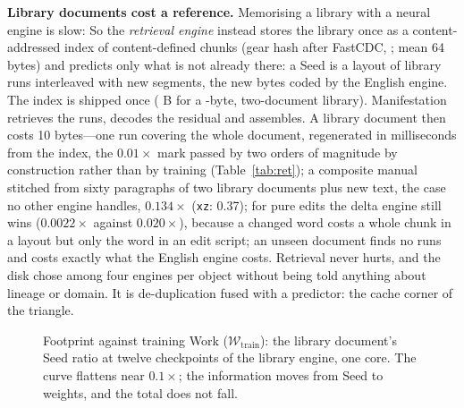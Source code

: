 \documentclass[11pt,a4paper]{article}
\theoremstyle{definition}
\theoremstyle{plain}
\theoremstyle{remark}
\newcommand{\Work}{\mathcal{W}}
\begin{document}
\textbf{Library documents cost a reference.} Memorising a library with a neural engine is slow:
\libworkShort{} So
the \emph{retrieval engine} instead stores the library once as a content-addressed index of
content-defined chunks (gear hash after FastCDC, \citealp{xia2016fastcdc}; mean 64 bytes) and
predicts only what is not already there: a Seed is a layout of library runs interleaved with new
segments, the new bytes coded by the English engine. The index is shipped once
(\retEngineBytes{} B for a \retLibraryBytes{}-byte, two-document library). Manifestation retrieves the runs, decodes the residual and assembles. A library document
then costs 10 bytes---one run covering the whole document, regenerated in milliseconds from the
index, the $0.01\times$ mark passed by two orders of magnitude by construction rather than by
training (Table~\ref{tab:ret}); a composite manual stitched from sixty paragraphs of
two library documents plus new text, the case no other engine handles, $0.134\times$
(\texttt{xz}: 0.37); for pure edits the delta engine still wins ($0.0022\times$ against $0.020\times$), because a
changed word costs a whole chunk in a layout but only the word in an edit script; an unseen
document finds no runs and costs exactly what the English engine costs. Retrieval never hurts,
and the disk chose among four engines per object without being told anything about lineage or
domain. It is de-duplication
\citep{muthitacharoen2001,tridgell1996} fused with a predictor: the cache corner of the triangle.

\begin{figure}[!htb]
\centering
\libworkPlot{}
\caption{Footprint against training Work ($\Work_{\mathrm{train}}$): the library document's Seed ratio at twelve checkpoints of the library engine, one core. The curve flattens near $0.1\times$; the information moves from Seed to weights, and the total does not fall.}
\label{fig:libwork}
\end{figure}

\begin{table}[!htb]
\centering\small
\caption{Retrieval engine beside the library, delta and English engines; every engine tried, the
smallest Seed wins. All bit-exact. \texttt{rev3\_5pct.txt} is a fresh random 5\,\% revision
generated for this experiment, hence its size differs from Table~\ref{tab:edit}.}
\label{tab:ret}
{\footnotesize\setlength{\tabcolsep}{2.6pt}\retTable{}}
\end{table}
\end{document}

